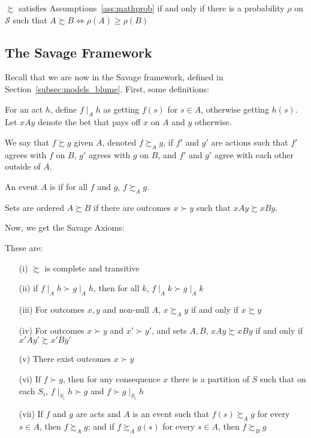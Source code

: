 \documentclass[12pt]{article}
\begin{document}
\begin{theorem}
	$\succsim$ satisfies Assumptions~\ref{ass:mathprob} if and only if there is a probability $\rho$ on $\mathcal{S}$ such that $A \succsim B \Longleftrightarrow \rho(A) \ge \rho(B)$ 
\end{theorem}


\subsection{The Savage Framework}

Recall that we are now in the Savage framework, defined in Section~\ref{subsec:models_blume}. First, some definitions:

\begin{definition}
	For an act $h$, define $f \mid_A h$ as getting $f(s)$ for $s \in A$, otherwise getting $h(s)$. Let $xAy$ denote the bet that pays off $x$ on $A$ and $y$ otherwise.
\end{definition}

\begin{definition}
	We say that $f \succsim g$ given $A$, denoted $f \succsim_A g$, if $f'$ and $g'$ are actions such that $f'$ agrees with $f$ on $B$, $g'$ agrees with $g$ on $B$, and $f'$ and $g'$ agree with each other outside of $A$.
\end{definition}

\begin{definition}
	An event $A$ is  if for all $f$ and $g$, $f \succsim_A g$.
\end{definition}

\begin{definition}
	Sets are ordered $A \succsim B$ if there are outcomes $x \succ y$ such that $xAy \succsim xBy$.
\end{definition}

Now, we get the Savage Axioms:

\begin{assumption}\label{ass:savage}
	These are:
	
	\begin{itemize}
		\item[(i)] $\succsim$ is complete and transitive
		\item[(ii)] if $f \mid_A h \succ g \mid_A h$, then for all $k$, $f \mid_A k \succ g \mid_Ak$
		\item[(iii)] For outcomes $x,y$ and non-null $A$, $x \succsim_A y$ if and only if $x \succsim y$
		\item[(iv)] For outcomes $x \succ y$ and $x' \succ y'$, and sets $A,B$, $xAy \succsim xBy$ if and only if $x' A y' \succsim x' B y'$
		\item[(v)] There exist outcomes $x \succ y$
		\item[(vi)] If $f \succ g$, then for any consequence $x$ there is a partition of $S$ such that on each $S_i$, $f \mid_{S_i} h \succ g$ and $f \succ g \mid_{S_i} h$
		\item[(vii)] If $f$ and $g$ are acts and $A$ is an event such that $f(s) \succsim_A g$ for every $s \in A$, then $f\succsim_A g$; and if $f \succsim_A g(s)$ for every $s \in A$, then $f \succsim_B g$
	\end{itemize}
\end{assumption}
\end{document}
